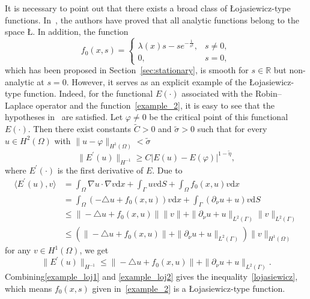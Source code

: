 \documentclass{elsarticle}
\begin{document}
It is necessary to point out that there exists a broad class of {\L}ojasiewicz-type functions. In~\cite[Lemma 3.8]{Hao2006}, the authors have proved that all analytic functions belong to the space {\L}.  
In addition, the function
\begin{equation}\label{example_2}
f_0(x, s) = 
\left
    \{
        \begin{array}{ll}
            \lambda(x)s - se^{-\frac{1}{s^2}}, & s \neq 0, \\
                  0, & s=0,
        \end{array}
\right.
\end{equation}
which has been proposed in Section~\ref{sec:stationary}, is smooth for $s\in\mathbb{R}$ but non-analytic at $s=0$. However, it serves as an explicit example of the {\L}ojasiewicz-type function. Indeed, for the functional $E(\cdot)$ associated with the Robin--Laplace operator and the function~\eqref{example_2}, it is easy to see that the hypotheses in~\cite[Corollary 4.6]{chill2003lojasiewicz} are satisfied. Let $\varphi\neq 0 $ be the critical point of this functional $E(\cdot)$. Then there exist constants $\tilde{C}>0$ and $\tilde{\sigma} > 0$ such that for every $u\in H^2(\Omega)$ with $\|u-\varphi\|_{H^1(\Omega)}<\tilde{\sigma}$
\begin{equation} \label{example_loj1}
	\|E^{\prime}(u)\|_{H^{-1}} \geqslant C|E(u) - E(\varphi)|^{1-\tilde{\eta}},
\end{equation}
where $E^{\prime}(\cdot)$ is the first derivative of $E$. Due to
\begin{equation*}
\begin{split}
\langle E^{\prime}(u), v\rangle &= \int_{\Omega}\nabla u\cdot\nabla v\mathrm{d}x +  \int_{\Gamma}uv\mathrm{d}S + \int_{\Omega}f_0(x, u)v\mathrm{d}x\\
&= \int_{\Omega}\left(-\triangle u + f_0(x, u)\right)v\mathrm{d}x +  \int_{\Gamma}(\partial_{\nu}u+u)v\mathrm{d}S \\
&\leqslant \|-\triangle u + f_0(x, u)\| \|v\|+  \|\partial_{\nu}u+u\|_{L^2(\Gamma)} \|v\|_{L^2(\Gamma)}\\
&\leqslant \left(\|-\triangle u + f_0(x, u)\| +  \|\partial_{\nu}u+u\|_{L^2(\Gamma)} \right)\|v\|_{H^1(\Omega)}
\end{split}
\end{equation*}
for any $v\in H^1(\Omega)$, we get 
\begin{equation}\label{example_loj2}
\|E^{\prime}(u)\|_{H^{-1}} \leqslant \|-\triangle u + f_0(x, u)\| +  \|\partial_{\nu}u+u\|_{L^2(\Gamma)}. 
\end{equation}
Combining\eqref{example_loj1} and \eqref{example_loj2} gives the inequality~\eqref{lojasiewicz}, which means $f_0(x, s)$ given in~\eqref{example_2} is a {\L}ojasiewicz-type function.
\end{document}
